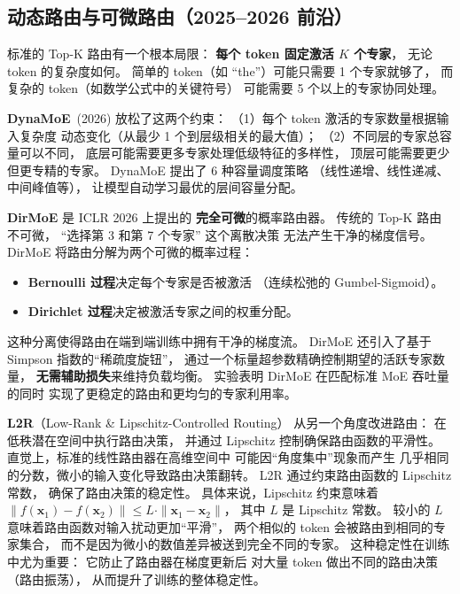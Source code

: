 \subsection{动态路由与可微路由（2025--2026 前沿）}
\label{sec:advanced-routing}

标准的 Top-K 路由有一个根本局限：
\textbf{每个 token 固定激活 $K$ 个专家}，
无论 token 的复杂度如何。
简单的 token（如 “the”）可能只需要 1 个专家就够了，
而复杂的 token（如数学公式中的关键符号）
可能需要 5 个以上的专家协同处理。

\textbf{DynaMoE}~(2026) 放松了这两个约束：%
（1）每个 token 激活的专家数量根据输入复杂度
动态变化（从最少 1 个到层级相关的最大值）；
（2）不同层的专家总容量可以不同，
底层可能需要更多专家处理低级特征的多样性，
顶层可能需要更少但更专精的专家。
DynaMoE 提出了 6 种容量调度策略
（线性递增、线性递减、中间峰值等），
让模型自动学习最优的层间容量分配。

\textbf{DirMoE} 是 ICLR 2026 上提出的%
\textbf{完全可微}的概率路由器。
传统的 Top-K 路由不可微，
“选择第 3 和第 7 个专家” 这个离散决策
无法产生干净的梯度信号。
DirMoE 将路由分解为两个可微的概率过程：
\begin{itemize}[noitemsep]
  \item \textbf{Bernoulli 过程}决定每个专家是否被激活
        （连续松弛的 Gumbel-Sigmoid）。
  \item \textbf{Dirichlet 过程}决定被激活专家之间的权重分配。
\end{itemize}
这种分离使得路由在端到端训练中拥有干净的梯度流。
DirMoE 还引入了基于 Simpson 指数的“稀疏度旋钮”，
通过一个标量超参数精确控制期望的活跃专家数量，
\textbf{无需辅助损失}来维持负载均衡。
实验表明 DirMoE 在匹配标准 MoE 吞吐量的同时
实现了更稳定的路由和更均匀的专家利用率。

\textbf{L2R}（Low-Rank \& Lipschitz-Controlled Routing）%
从另一个角度改进路由：
在低秩潜在空间中执行路由决策，
并通过 Lipschitz 控制确保路由函数的平滑性。
直觉上，标准的线性路由器在高维空间中
可能因“角度集中”现象而产生
几乎相同的分数，微小的输入变化导致路由决策翻转。
L2R 通过约束路由函数的 Lipschitz 常数，
确保了路由决策的稳定性。
具体来说，Lipschitz 约束意味着
$\|f(\mathbf{x}_1) - f(\mathbf{x}_2)\| \leq L \cdot \|\mathbf{x}_1 - \mathbf{x}_2\|$，
其中 $L$ 是 Lipschitz 常数。
较小的 $L$ 意味着路由函数对输入扰动更加“平滑”，
两个相似的 token 会被路由到相同的专家集合，
而不是因为微小的数值差异被送到完全不同的专家。
这种稳定性在训练中尤为重要：
它防止了路由器在梯度更新后
对大量 token 做出不同的路由决策（路由振荡），
从而提升了训练的整体稳定性。

